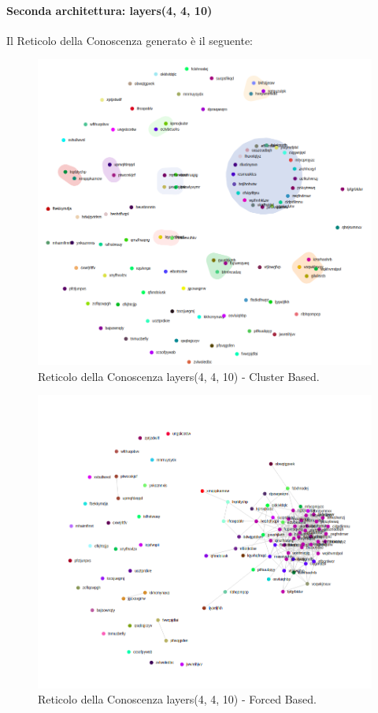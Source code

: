\paragraph{Seconda architettura: layers(4, 4, 10)}\mbox{}
\label{Seconda architettura}
\noindent
Il Reticolo della Conoscenza generato è il seguente:
\begin{figure}[H]
\centering
	\includegraphics[width=0.70\linewidth]{./image/logica(4,4,10).png}
	\caption{Reticolo della Conoscenza layers(4, 4, 10) - Cluster Based.}
	\label{Reticolo della Conoscenza layers(4, 4, 10) - Cluster Based.}
\end{figure}
\noindent

\begin{figure}[H]
\centering
	\includegraphics[width=0.70\linewidth]{./image/logica(4,4,10)_forced.png}
	\caption{Reticolo della Conoscenza layers(4, 4, 10) - Forced Based.}
	\label{Reticolo della Conoscenza layers(4, 4, 10) - Forced Based.}
\end{figure}
\noindent

